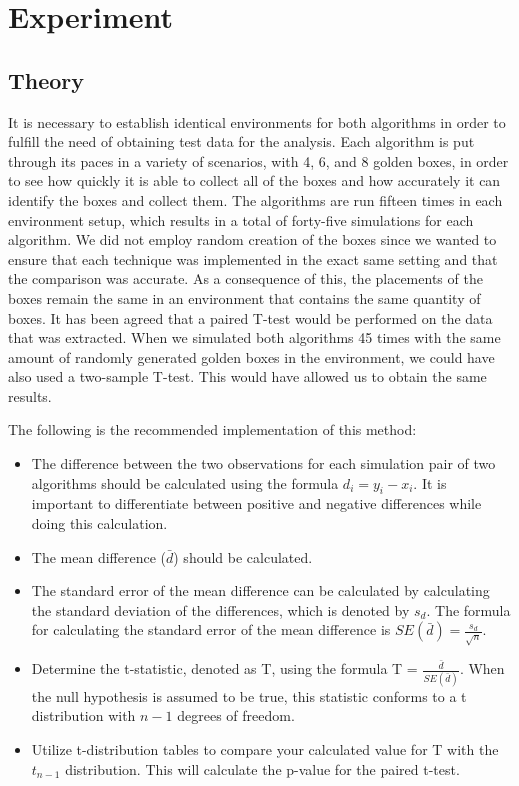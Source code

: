 \section{Experiment}\label{P3}
\subsection{Theory}

It is necessary to establish identical environments for both algorithms in order to fulfill the need of obtaining test data for the analysis. 
 Each algorithm is put through its paces in a variety of scenarios, with 4, 6, and 8 golden boxes, in order to see how quickly it is able to collect all of the boxes and how accurately it can identify the boxes and collect them. 
 The algorithms are run fifteen times in each environment setup, which results in a total of forty-five simulations for each algorithm. 
 We did not employ random creation of the boxes since we wanted to ensure that each technique was implemented in the exact same setting and that the comparison was accurate. 
 As a consequence of this, the placements of the boxes remain the same in an environment that contains the same quantity of boxes. It has been agreed that a paired T-test would be performed on the data that was extracted. 
 When we simulated both algorithms 45 times with the same amount of randomly generated golden boxes in the environment, we could have also used a two-sample T-test. This would have allowed us to obtain the same results.

The following is the recommended implementation of this method:
\begin{itemize}
    \item The difference between the two observations for each simulation pair of two algorithms should be calculated using the formula $d_i = y_i - x_i$. It is important to differentiate between positive and negative differences while doing this calculation.
    \item The mean difference ($\bar{d}$) should be calculated.
    \item The standard error of the mean difference can be calculated by calculating the standard deviation of the differences, which is denoted by $s_d$. The formula for calculating the standard error of the mean difference is $SE(\bar{d}) = \frac{s_d}{\sqrt{n}}$.
    \item Determine the t-statistic, denoted as T, using the formula T = $\frac{\bar{d}}{SE(\bar{d})}$. When the null hypothesis is assumed to be true, this statistic conforms to a t distribution with $n - 1$ degrees of freedom.
    \item Utilize t-distribution tables to compare your calculated value for T with the $t_{n-1}$ distribution. This will calculate the p-value for the paired t-test.
\end{itemize}

